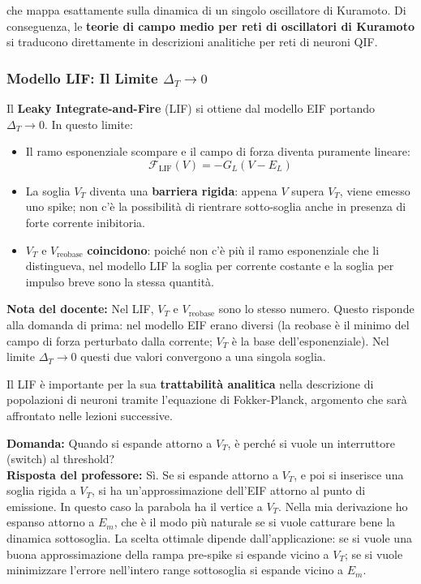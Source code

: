 che mappa esattamente sulla dinamica di un singolo oscillatore di Kuramoto. Di conseguenza, le \textbf{teorie di campo medio per reti di oscillatori di Kuramoto} si traducono direttamente in descrizioni analitiche per reti di neuroni QIF.

\subsubsection{Modello LIF: Il Limite $\Delta_T \to 0$}

Il \textbf{Leaky Integrate-and-Fire} (LIF) si ottiene dal modello EIF portando $\Delta_T \to 0$. In questo limite:

\begin{itemize}
    \item Il ramo esponenziale scompare e il campo di forza diventa puramente lineare:
    \begin{equation}
    \mathcal{F}_{\text{LIF}}(V) = -G_L(V - E_L)
    \end{equation}
    \item La soglia $V_T$ diventa una \textbf{barriera rigida}: appena $V$ supera $V_T$, viene emesso uno spike; non c'è la possibilità di rientrare sotto-soglia anche in presenza di forte corrente inibitoria.
    \item $V_T$ e $V_{\text{reobase}}$ \textbf{coincidono}: poiché non c'è più il ramo esponenziale che li distingueva, nel modello LIF la soglia per corrente costante e la soglia per impulso breve sono la stessa quantità.
\end{itemize}

\begin{tcolorbox}[colback=gray!5, colframe=gray!40, arc=2mm, boxrule=0.5pt]
\textbf{Nota del docente:} Nel LIF, $V_T$ e $V_{\text{reobase}}$ sono lo stesso numero. Questo risponde alla domanda di prima: nel modello EIF erano diversi (la reobase è il minimo del campo di forza perturbato dalla corrente; $V_T$ è la base dell'esponenziale). Nel limite $\Delta_T \to 0$ questi due valori convergono a una singola soglia.
\end{tcolorbox}

Il LIF è importante per la sua \textbf{trattabilità analitica} nella descrizione di popolazioni di neuroni tramite l'equazione di Fokker-Planck, argomento che sarà affrontato nelle lezioni successive.


\begin{tcolorbox}[colback=gray!5, colframe=gray!40, arc=2mm, boxrule=0.5pt]
\textbf{Domanda:} Quando si espande attorno a $V_T$, è perché si vuole un interruttore (switch) al threshold?\\
\textbf{Risposta del professore:} Sì. Se si espande attorno a $V_T$, e poi si inserisce una soglia rigida a $V_T$, si ha un'approssimazione dell'EIF attorno al punto di emissione. In questo caso la parabola ha il vertice a $V_T$. Nella mia derivazione ho espanso attorno a $E_m$, che è il modo più naturale se si vuole catturare bene la dinamica sottosoglia. La scelta ottimale dipende dall'applicazione: se si vuole una buona approssimazione della rampa pre-spike si espande vicino a $V_T$; se si vuole minimizzare l'errore nell'intero range sottosoglia si espande vicino a $E_m$.
\end{tcolorbox}


